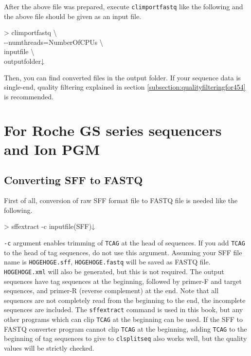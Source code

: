 \documentclass[titlepage,10pt,a4paper,english]{jsbook}
\newenvironment{cmd}{\begin{oframed}\raggedright\ttfamily\footnotesize\setlength{\baselineskip}{1.4em}}{\end{oframed}\vspace{-1em}}
\begin{document}
After the above file was prepared, execute \texttt{climportfastq} like the following and the above file should be given as an input file.

\begin{cmd}
{\textgreater} climportfastq {\textbackslash}\\
{-}{-}numthreads=NumberOfCPUs {\textbackslash}\\
inputfile {\textbackslash}\\
outputfolder↓
\end{cmd}

Then, you can find converted files in the output folder.
If your sequence data is single-end, quality filtering explained in section \ref{subsection:qualityfilteringfor454} is recommended.

\section{For Roche GS series sequencers and Ion PGM}

\subsection{Converting SFF to FASTQ}

First of all, conversion of raw SFF format file to FASTQ file is needed like the following.

\begin{cmd}
{\textgreater} sff{\textunderscore}extract -c inputfile(SFF)↓
\end{cmd}

\texttt{-c} argument enables trimming of \texttt{TCAG} at the head of sequences.
If you add \texttt{TCAG} to the head of tag sequences, do not use this argument.
Assuming your SFF file name is \texttt{HOGEHOGE.sff}, \texttt{HOGEHOGE.fastq} will be saved as FASTQ file.
\texttt{HOGEHOGE.xml} will also be generated, but this is not required.
The output sequences have tag sequences at the beginning, followed by primer-F and target sequences, and primer-R (reverse complement) at the end.
Note that all sequences are not completely read from the beginning to the end, the incomplete sequences are included.
The \texttt{sff{\textunderscore}extract} command is used in this book, but any other programs which can clip \texttt{TCAG} at the beginning can be used.
If the SFF to FASTQ converter program cannot clip \texttt{TCAG} at the beginning, adding \texttt{TCAG} to the beginning of tag sequences to give to \texttt{clsplitseq} also works well, but the quality values will be strictly checked.
\end{document}
